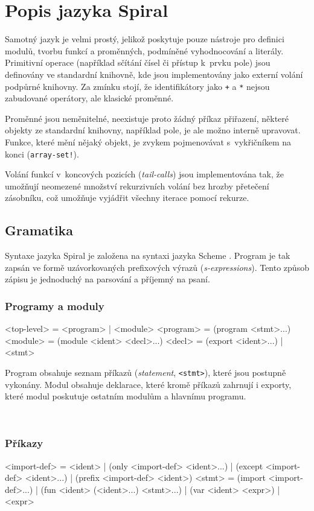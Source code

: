 \chapter{Popis jazyka Spiral}

Samotný jazyk je velmi prostý, jelikož poskytuje pouze
nástroje pro definici modulů, tvorbu funkcí a proměnných, podmíněné
vyhodnocování a literály.  Primitivní operace (například sčítání čísel či
přístup k~prvku pole) jsou definovány ve standardní knihovně, kde jsou
implementovány jako externí volání podpůrné knihovny. Za zmínku stojí, že
identifikátory jako \texttt{+} a \texttt{*} nejsou zabudované operátory, ale
klasické proměnné. 

Proměnné jsou neměnitelné, neexistuje proto žádný příkaz přiřazení, některé
objekty ze standardní knihovny, například pole, je ale možno interně upravovat.
Funkce, které mění nějaký objekt, je zvykem pojmenovávat s~vykřičníkem na konci
(\texttt{array-set!}).

Volání funkcí v~koncových pozicích (\emph{tail-calls}) jsou implementována tak,
že umožňují neomezené množství rekurzivních volání bez hrozby přetečení
zásobníku, což umožňuje vyjádřit všechny iterace pomocí rekurze.

\section{Gramatika}

Syntaxe jazyka Spiral je založena na syntaxi jazyka Scheme \cite{scheme7}.
Program je tak zapsán ve formě uzávorkovaných prefixových výrazů
(\emph{s-expressions}). Tento způsob zápisu je jednoduchý na parsování a
příjemný na psaní.

\subsection{Programy a moduly}
\begin{ttcode}
<top-level>   = <program> | <module>
<program>     = (program <stmt>...)
<module>      = (module <ident> <decl>...)
<decl>        = (export <ident>...) | <stmt>
\end{ttcode}

Program obsahuje seznam příkazů (\emph{statement}, \texttt{<stmt>}), které jsou
postupně vykonány. Modul obsahuje deklarace, které kromě příkazů zahrnují i
exporty, které modul poskutuje ostatním modulům a hlavnímu programu.

~
\subsection{Příkazy}
\begin{ttcode}
<import-def>  = <ident>
              | (only <import-def> <ident>...)
              | (except <import-def> <ident>...)
              | (prefix <import-def> <ident>)
<stmt>        = (import <import-def>...)
              | (fun <ident> (<ident>...) <stmt>...)
              | (var <ident> <expr>)
              | <expr>
\end{ttcode}


